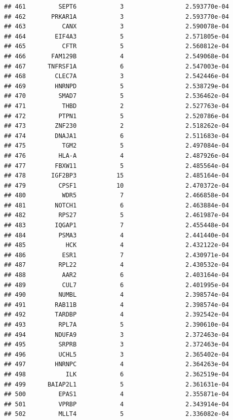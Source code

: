 \documentclass[
]{article}
\begin{document}
\begin{verbatim}
## 461         SEPT6            3                 2.593770e-04
## 462       PRKAR1A            3                 2.593770e-04
## 463          CANX            3                 2.590078e-04
## 464        EIF4A3            5                 2.571805e-04
## 465          CFTR            5                 2.560812e-04
## 466       FAM129B            4                 2.549068e-04
## 467      TNFRSF1A            6                 2.547003e-04
## 468        CLEC7A            3                 2.542446e-04
## 469        HNRNPD            5                 2.538729e-04
## 470         SMAD7            5                 2.536462e-04
## 471          THBD            2                 2.527763e-04
## 472         PTPN1            5                 2.520786e-04
## 473        ZNF230            2                 2.518262e-04
## 474        DNAJA1            6                 2.511683e-04
## 475          TGM2            5                 2.497084e-04
## 476         HLA-A            4                 2.487926e-04
## 477        FBXW11            5                 2.485564e-04
## 478       IGF2BP3           15                 2.485164e-04
## 479         CPSF1           10                 2.470372e-04
## 480          WDR5            7                 2.466858e-04
## 481        NOTCH1            6                 2.463884e-04
## 482         RPS27            5                 2.461987e-04
## 483        IQGAP1            7                 2.455448e-04
## 484         PSMA3            4                 2.441440e-04
## 485           HCK            4                 2.432122e-04
## 486          ESR1            7                 2.430971e-04
## 487         RPL22            4                 2.430532e-04
## 488          AAR2            6                 2.403164e-04
## 489          CUL7            6                 2.401995e-04
## 490         NUMBL            4                 2.398574e-04
## 491        RAB11B            4                 2.398574e-04
## 492        TARDBP            4                 2.392542e-04
## 493         RPL7A            5                 2.390610e-04
## 494        NDUFA9            3                 2.372463e-04
## 495         SRPRB            3                 2.372463e-04
## 496         UCHL5            3                 2.365402e-04
## 497        HNRNPC            4                 2.364263e-04
## 498           ILK            6                 2.362519e-04
## 499      BAIAP2L1            5                 2.361631e-04
## 500         EPAS1            4                 2.355871e-04
## 501         VPRBP            4                 2.343914e-04
## 502         MLLT4            5                 2.336082e-04

\end{verbatim}
\end{document}
